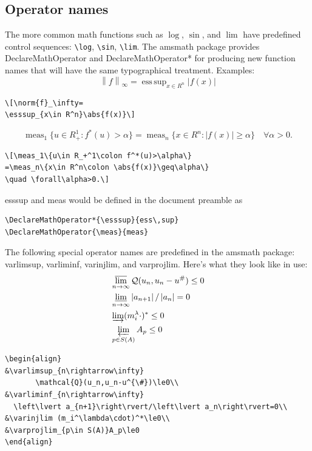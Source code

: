 \documentclass{article}
\newcommand{\ntt}{\normalfont\ttfamily}
\newcommand{\cn}[1]{{\protect\ntt\bslash#1}}
\newcommand{\pkg}[1]{{\protect\ntt#1}}
\theoremstyle{definition}
\theoremstyle{remark}
\DeclareMathOperator{\esssup}{ess\,sup}
\DeclareMathOperator{\meas}{meas}
\newcommand{\envert}[1]{\left\lvert#1\right\rvert}
\let\abs=\envert
\newcommand{\enVert}[1]{\left\lVert#1\right\rVert}
\let\norm=\enVert
\begin{document}
\subsection{Operator names}
The more common math functions such as $\log$, $\sin$, and $\lim$
have predefined control sequences: \verb=\log=, \verb=\sin=,
\verb=\lim=.
The \pkg{amsmath} package provides \cn{DeclareMathOperator} and
\cn{DeclareMathOperator*}
for producing new function names that will have the
same typographical treatment.
Examples:
\[\norm{f}_\infty=
\esssup_{x\in R^n}\abs{f(x)}\]
\begin{verbatim}
\[\norm{f}_\infty=
\esssup_{x\in R^n}\abs{f(x)}\]
\end{verbatim}
\[\meas_1\{u\in R_+^1\colon f^*(u)>\alpha\}
=\meas_n\{x\in R^n\colon \abs{f(x)}\geq\alpha\}
\quad \forall\alpha>0.\]
\begin{verbatim}
\[\meas_1\{u\in R_+^1\colon f^*(u)>\alpha\}
=\meas_n\{x\in R^n\colon \abs{f(x)}\geq\alpha\}
\quad \forall\alpha>0.\]
\end{verbatim}
\cn{esssup} and \cn{meas} would be defined in the document preamble as
\begin{verbatim}
\DeclareMathOperator*{\esssup}{ess\,sup}
\DeclareMathOperator{\meas}{meas}
\end{verbatim}

The following special operator names are predefined in the \pkg{amsmath}
package: \cn{varlimsup}, \cn{varliminf}, \cn{varinjlim}, and
\cn{varprojlim}. Here's what they look like in use:
\begin{align}
&\varlimsup_{n\rightarrow\infty}
       \mathcal{Q}(u_n,u_n-u^{\#})\le0\\
&\varliminf_{n\rightarrow\infty}
  \left\lvert a_{n+1}\right\rvert/\left\lvert a_n\right\rvert=0\\
&\varinjlim (m_i^\lambda\cdot)^*\le0\\
&\varprojlim_{p\in S(A)}A_p\le0
\end{align}
\begin{verbatim}
\begin{align}
&\varlimsup_{n\rightarrow\infty}
       \mathcal{Q}(u_n,u_n-u^{\#})\le0\\
&\varliminf_{n\rightarrow\infty}
  \left\lvert a_{n+1}\right\rvert/\left\lvert a_n\right\rvert=0\\
&\varinjlim (m_i^\lambda\cdot)^*\le0\\
&\varprojlim_{p\in S(A)}A_p\le0
\end{align}
\end{verbatim}
\end{document}
